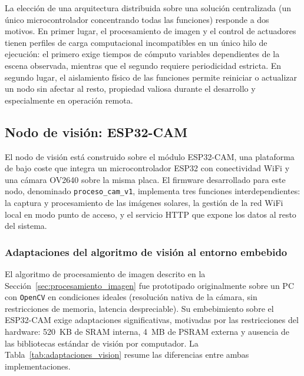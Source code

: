La elección de una arquitectura distribuida sobre una solución centralizada (un único microcontrolador concentrando todas las funciones) responde a dos motivos. En primer lugar, el procesamiento de imagen y el control de actuadores tienen perfiles de carga computacional incompatibles en un único hilo de ejecución: el primero exige tiempos de cómputo variables dependientes de la escena observada, mientras que el segundo requiere periodicidad estricta. En segundo lugar, el aislamiento físico de las funciones permite reiniciar o actualizar un nodo sin afectar al resto, propiedad valiosa durante el desarrollo y especialmente en operación remota.

\subsection{Nodo de visión: ESP32-CAM}
\label{sec:nodo_vision}

El nodo de visión está construido sobre el módulo ESP32-CAM, una plataforma de bajo coste que integra un microcontrolador ESP32 con conectividad WiFi y una cámara OV2640 sobre la misma placa. El firmware desarrollado para este nodo, denominado \texttt{proceso\_cam\_v1}, implementa tres funciones interdependientes: la captura y procesamiento de las imágenes solares, la gestión de la red WiFi local en modo punto de acceso, y el servicio HTTP que expone los datos al resto del sistema.

\subsubsection{Adaptaciones del algoritmo de visión al entorno embebido}
\label{sec:adaptaciones_embebidas}

El algoritmo de procesamiento de imagen descrito en la Sección~\ref{sec:procesamiento_imagen} fue prototipado originalmente sobre un PC con \texttt{OpenCV} en condiciones ideales (resolución nativa de la cámara, sin restricciones de memoria, latencia despreciable). Su embebimiento sobre el ESP32-CAM exige adaptaciones significativas, motivadas por las restricciones del hardware: 520~KB de SRAM interna, 4~MB de PSRAM externa y ausencia de las bibliotecas estándar de visión por computador. La Tabla~\ref{tab:adaptaciones_vision} resume las diferencias entre ambas implementaciones.

